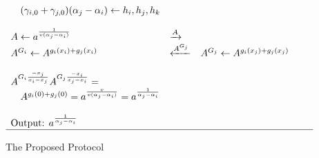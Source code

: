 \begin{figure}[H]
$$\begin{array}{lllll}
            &        &        &        &        \\
    \quad (\gamma_{i,0} + \gamma_{j,0})(\alpha_j - \alpha_i) \leftarrow h_i,h_j,h_k
            &        &        &        &        \\
    \\
    A \leftarrow a^{\frac{1}{v(\alpha_j - \alpha_i)}}
            & \xrightarrow{A}
                    &        &        &        \\
    A^{G_i} \leftarrow A^{g_i(x_i)+g_j(x_i)}    
            & \xleftarrow{A^{G_j}}
                    & A^{G_j} \leftarrow A^{g_i(x_j)+g_j(x_j)}
                             &        &        \\
    \\
    A^{G_i\frac{-x_j}{x_i - x_j}} A^{G_j\frac{-x_i}{x_j - x_i}} = 
            &        &        &        &        \\
    \quad A^{g_i(0) + g_j(0)} = a^{\frac{v}{v(\alpha_j - \alpha_i)}} = a^{\frac{1}{\alpha_j - \alpha_i}}
            &        &        &        &        \\
    \\
    \text{Output: } a^{\frac{1}{\alpha_j - \alpha_i}}
            &        &        &        &        \\
    \hline
\end{array} 
$$
\normalsize
\caption{The Proposed Protocol}
\label{fig:proposed_protocol}
\end{figure}